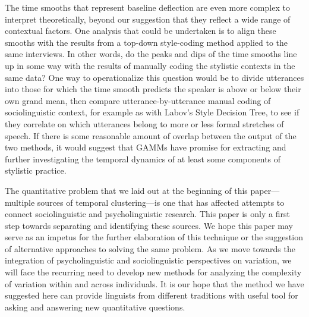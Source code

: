 \documentclass[12pt]{article}
\begin{document}
The time smooths that represent baseline deflection are even more complex to interpret theoretically, beyond our suggestion that they reflect a wide range of contextual factors. One analysis that could be undertaken is to align these smooths with the results from a top-down style-coding method applied to the same interviews. In other words, do the peaks and dips of the time smooths line up in some way with the results of  manually coding the stylistic contexts in the same data? One way to operationalize this question would be to divide utterances into those for which the time smooth predicts the speaker is above or below their own grand mean, then compare utterance-by-utterance manual coding of sociolinguistic context, for example as with Labov's \citeyearpar{Labov:2001} Style Decision Tree, to see if they correlate on which utterances belong to more or less formal stretches of speech. If there is some reasonable amount of overlap between the output of the two methods, it would suggest that GAMMs have promise for extracting and further investigating the temporal dynamics of at least some components of stylistic practice. 


The quantitative problem that we laid out at the beginning of this paper---multiple sources of temporal clustering---is one that has affected attempts to connect sociolinguistic and psycholinguistic research. This paper is only a first step towards separating and identifying these sources. We hope this paper may serve as an impetus for the further elaboration of this technique or the suggestion of alternative approaches to solving the same problem. As we move towards the integration of psycholinguistic and sociolinguistic perspectives on variation, we will face the recurring need to develop new methods for analyzing the complexity of variation within and across individuals.  It is our hope that the  method we have suggested here can provide linguists from different traditions with useful tool for asking and answering new quantitative questions.






\end{document}
